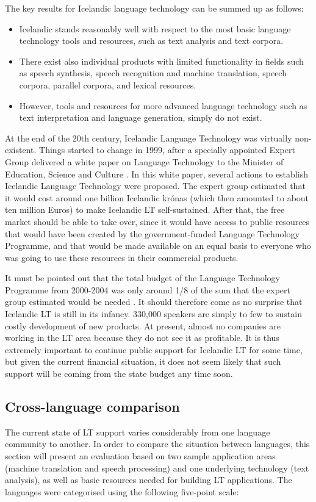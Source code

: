 \begin{multicols}{2}
The key results for Icelandic language technology can be summed up as follows:

\begin{itemize}
\item Icelandic stands reasonably well with respect to the most basic language technology tools and resources, such as text analysis and text corpora.
\item There exist also individual products with limited functionality in fields such as speech synthesis, speech recognition and machine translation, speech corpora, parallel corpora, and lexical resources. 
\item However, tools and resources for more advanced language technology such as text interpretation and language generation, simply do not exist.
\end{itemize}

At the end of the 20th century, Icelandic Language Technology was virtually non-existent. Things started to change in 1999, after a specially appointed Expert Group delivered a white paper on Language Technology to the Minister of Education, Science and Culture \cite{sky1}.  In this white paper, several actions to establish Icelandic Language Technology were proposed. The expert group estimated that it would cost around one billion Icelandic krónas (which then amounted to about ten million Euros) to make Icelandic LT self-sustained. After that, the free market should be able to take over, since it would have access to public resources that would have been created by the government-funded Language Technology Programme, and that would be made available on an equal basis to everyone who was going to use these resources in their commercial products.

It must be pointed out that the total budget of the Language Technology Programme from 2000-2004 was only around 1/8 of the sum that the expert group estimated would be needed \cite{ilrt1}.  It should therefore come as no surprise that Icelandic LT is still in its infancy. 330,000 speakers are simply to few to sustain costly development of new products. At present, almost no companies are working in the LT area because they do not see it as profitable. It is thus extremely important to continue public support for Icelandic LT for some time, but given the current financial situation, it does not seem likely that such support will be coming from the state budget any time soon.

\subsection{Cross-language comparison}
The current state of LT support varies considerably from one language community to another. In order to compare the situation between languages, this section will present an evaluation based on two sample application areas (machine translation and speech processing) and one underlying technology (text analysis), as well as basic resources needed for building LT applications. The languages were categorised using the following five-point scale: 


\end{multicols}
